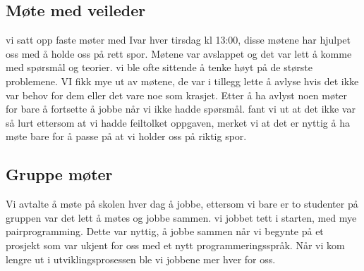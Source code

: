 \subsection{Møte med veileder}
vi satt opp faste møter med Ivar hver tirsdag kl 13:00, disse møtene har hjulpet oss med å holde oss på rett spor. Møtene var avslappet og det var lett å komme med spørsmål og teorier. vi ble ofte sittende å tenke høyt på de største problemene. VI fikk mye ut av møtene, de var i tillegg lette å avlyse hvis det ikke var behov for dem eller det vare noe som krasjet. Etter å ha avlyst noen møter for bare å fortsette å jobbe når vi ikke hadde spørsmål. fant vi ut at det ikke var så lurt ettersom at vi hadde feiltolket oppgaven, merket vi at det er nyttig å ha møte bare for å passe på at vi holder oss på riktig spor.

\subsection{Gruppe møter} 
Vi avtalte å møte på skolen hver dag å jobbe, ettersom vi bare er to studenter på gruppen var det lett å møtes og jobbe sammen. vi jobbet tett i starten, med mye pairprogramming. Dette var nyttig, å jobbe sammen når vi begynte på et prosjekt som var ukjent for oss med et nytt programmeringsspråk. Når vi kom lengre ut i utviklingsprosessen ble vi jobbene mer hver for oss.

